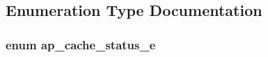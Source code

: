 \subsection{Enumeration Type Documentation}
\subsubsection[{\texorpdfstring{ap\+\_\+cache\+\_\+status\+\_\+e}{ap_cache_status_e}}]{\setlength{\rightskip}{0pt plus 5cm}enum {\bf ap\+\_\+cache\+\_\+status\+\_\+e}}\hypertarget{group__MOD__CACHE_ga867e7fa27c3e0b612302472979849418}{}\label{group__MOD__CACHE_ga867e7fa27c3e0b612302472979849418}
